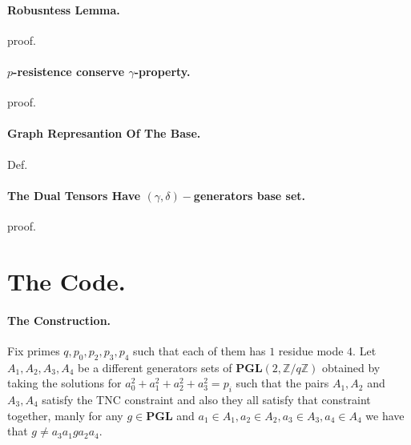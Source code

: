 \documentclass{article}
\begin{document}
\begin{multicols*}{2}
	\paragraph{Robusntess Lemma.} proof. 
	\paragraph{$p$-resistence conserve $\gamma$-property. } proof. 
	\paragraph{Graph Represantion Of The Base. } Def. 
	\paragraph{The Dual Tensors Have $\left( \gamma,\delta \right)-$generators base set.} proof.
	\section{The Code.}
 \paragraph{The Construction.} Fix primes $q,p_0,p_2,p_3,p_4$ such that each of them has $1 $ residue mode $4$. Let $A_{1},A_{2},A_{3},A_{4}$ be a different generators sets of $ \mathbf{PGL}(2 , \mathbb{Z} / q\mathbb{Z} )  $ 
  obtained by taking the solutions for $a_{0}^{2} + a_{1}^{2} +a_{2}^{2} +a_{3}^{2} = p_i $ such that the pairs $A_{1},A_{2}$ and $A_{3},A_{4}$ satisfy the 
  TNC constraint and also they all satisfy that constraint together, manly for any $g \in \mathbf{PGL}$  and $a_{1}\in A_{1}, a_{2} \in A_{2}, a_{3} \in A_{3}, a_{4} \in A_{4}$ we have that $ g \neq a_{3}a_{1}ga_{2}a_{4}$. 
  

\end{multicols*}
\end{document}
